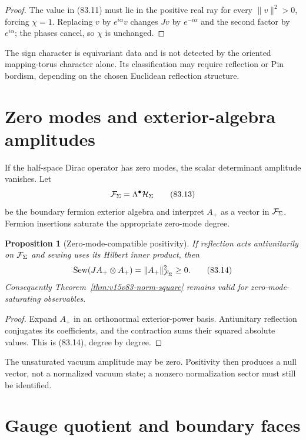 \documentclass[11pt]{article}
\newtheorem{proposition}[theorem]{Proposition}
\theoremstyle{remark}
\begin{document}
\begin{proof}
The value in (83.11) must lie in the positive real ray for every
\(\|v\|^2>0\), forcing \(\chi=1\).  Replacing \(v\) by
\(e^{i\alpha}v\) changes \(Jv\) by \(e^{-i\alpha}\) and the second
factor by \(e^{i\alpha}\); the phases cancel, so \(\chi\) is
unchanged.
\end{proof}

The sign character is equivariant data and is not detected by the
oriented mapping-torus character alone.  Its classification may
require reflection or Pin bordism, depending on the chosen
Euclidean reflection structure.

\section{Zero modes and exterior-algebra amplitudes}

If the half-space Dirac operator has zero modes, the scalar
determinant amplitude vanishes.  Let
\[
 {\cal F}_\Sigma=\Lambda^\bullet{\cal H}_\Sigma       \tag{83.13}
\]
be the boundary fermion exterior algebra and interpret \(A_+\) as
a vector in \({\cal F}_\Sigma\).  Fermion insertions saturate the
appropriate zero-mode degree.

\begin{proposition}[Zero-mode-compatible positivity]
\label{prop:v15v83-zero}
If reflection acts antiunitarily on \({\cal F}_\Sigma\) and sewing
uses its Hilbert inner product, then
\[
 {\rm Sew}(JA_+\otimes A_+)=\|A_+\|_{{\cal F}_\Sigma}^2\geq0.    \tag{83.14}
\]
Consequently Theorem~\ref{thm:v15v83-norm-square} remains valid for
zero-mode-saturating observables.
\end{proposition}

\begin{proof}
Expand \(A_+\) in an orthonormal exterior-power basis.  Antiunitary
reflection conjugates its coefficients, and the contraction sums
their squared absolute values.  This is (83.14), degree by degree.
\end{proof}

The unsaturated vacuum amplitude may be zero.  Positivity then
produces a null vector, not a normalized vacuum state; a nonzero
normalization sector must still be identified.

\section{Gauge quotient and boundary faces}
\end{document}
